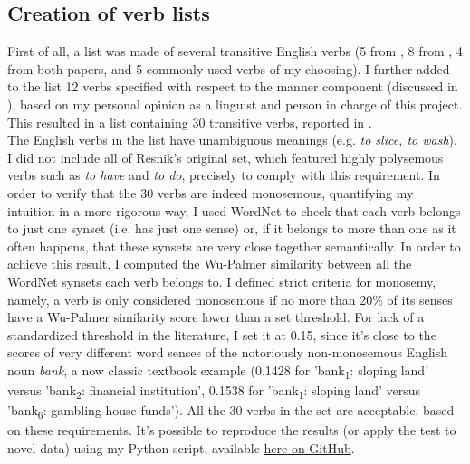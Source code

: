 \subsection{Creation of verb lists} 
First of all, a list was made of several transitive English verbs (5 from \textcite{Resnik1993}, 8 from \textcite{Levin1993}, 4 from both papers, and 5 commonly used verbs of my choosing). I further added to the list 12 verbs specified with respect to the manner component (discussed in ), based on my personal opinion as a linguist and person in charge of this project. This resulted in a list containing 30 transitive verbs, reported in .\\
The English verbs in the list have unambiguous meanings (e.g. \textit{to slice, to wash}). I did not include all of Resnik's original set, which featured highly polysemous verbs such as \textit{to have} and \textit{to do}, precisely to comply with this requirement. In order to verify that the 30 verbs are indeed monosemous, quantifying my intuition in a more rigorous way, I used WordNet \parencite{Miller1995} to check that each verb belongs to just one synset (i.e. has just one sense) or, if it belongs to more than one as it often happens, that these synsets are very close together semantically. In order to achieve this result, I computed the Wu-Palmer similarity between all the WordNet synsets each verb belongs to. I defined strict criteria for monosemy, namely, a verb is only considered monosemous if no more than 20\% of its senses have a Wu-Palmer similarity score lower than a set threshold. For lack of a standardized threshold in the literature, I set it at 0.15, since it's close to the scores of very different word senses of the notoriously non-monosemous English noun \textit{bank}, a now classic textbook example (0.1428 for 'bank\textsubscript{1}: sloping land' versus 'bank\textsubscript{2}: financial institution', 0.1538 for 'bank\textsubscript{1}: sloping land' versus 'bank\textsubscript{6}: gambling house funds'). All the 30 verbs in the set are acceptable, based on these requirements. It's possible to reproduce the results (or apply the test to novel data) using my Python script, available \href{https://github.com/giuliacappelli/checkPolysemy}{here on GitHub}.\\
